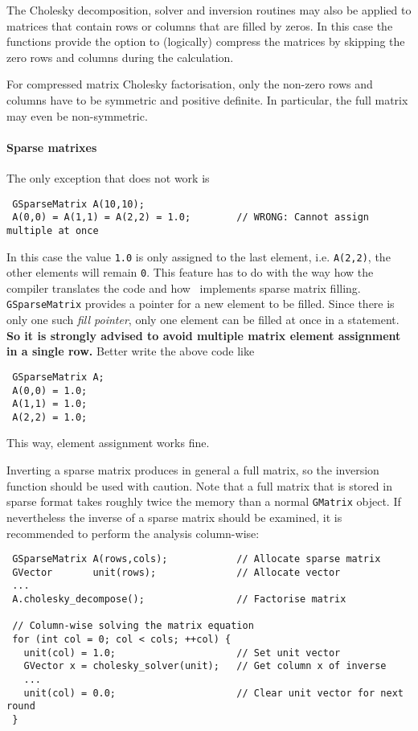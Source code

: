 \documentclass{article}[12pt,a4]
\begin{document}
The Cholesky decomposition, solver and inversion
routines may also be applied to matrices that contain rows or
columns that are filled by zeros.
In this case the functions provide the option to (logically)
compress the matrices by skipping the zero rows and columns during
the calculation.

For compressed matrix Cholesky factorisation, only the non-zero rows 
and columns have to be symmetric and positive definite.
In particular, the full matrix may even be non-symmetric.


\paragraph{Sparse matrixes}

The only exception that does not work is
\begin{verbatim}
 GSparseMatrix A(10,10);
 A(0,0) = A(1,1) = A(2,2) = 1.0;        // WRONG: Cannot assign multiple at once
\end{verbatim}
In this case the value {\tt 1.0} is only assigned to the last 
element, i.e. {\tt A(2,2)}, the other elements will remain
{\tt 0}.
This feature has to do with the way how the compiler translates
the code and how \this\ implements sparse matrix filling.
{\tt GSparseMatrix} provides a pointer for a new element to be 
filled.
Since there is only one such {\em fill pointer}, only one element can 
be filled at once in a statement.
{\bf So it is strongly advised to avoid multiple matrix element 
assignment in a single row.}
Better write the above code like
\begin{verbatim}
 GSparseMatrix A;
 A(0,0) = 1.0;
 A(1,1) = 1.0;
 A(2,2) = 1.0;
\end{verbatim}
This way, element assignment works fine.

Inverting a sparse matrix produces in general a full matrix, so the 
inversion function should be used with caution.
Note that a full matrix that is stored in sparse format takes roughly
twice the memory than a normal {\tt GMatrix} object.
If nevertheless the inverse of a sparse matrix should be examined, it 
is recommended to perform the analysis column-wise:
\begin{verbatim}
 GSparseMatrix A(rows,cols);            // Allocate sparse matrix
 GVector       unit(rows);              // Allocate vector
 ...
 A.cholesky_decompose();                // Factorise matrix

 // Column-wise solving the matrix equation
 for (int col = 0; col < cols; ++col) {
   unit(col) = 1.0;                     // Set unit vector
   GVector x = cholesky_solver(unit);   // Get column x of inverse
   ...
   unit(col) = 0.0;                     // Clear unit vector for next round
 }
\end{verbatim}
\end{document}
